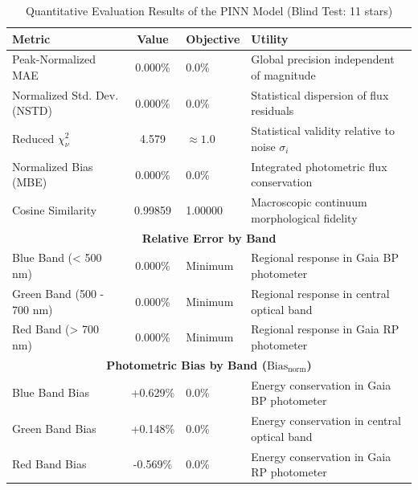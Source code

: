 
\begin{table}[htpb]
\centering
\caption{Quantitative Evaluation Results of the PINN Model (Blind Test: 11 stars)}
\label{tab:pinn_evaluation}
\begin{tabular}{lcll}
\hline
\textbf{Metric} & \textbf{Value} & \textbf{Objective} & \textbf{Utility} \\
\hline
Peak-Normalized MAE & 0.000\% & 0.0\% & Global precision independent of magnitude \\
Normalized Std. Dev. (NSTD) & 0.000\% & 0.0\% & Statistical dispersion of flux residuals \\
Reduced $\chi^2_\nu$ & 4.579 & $\approx 1.0$ & Statistical validity relative to noise $\sigma_i$ \\
Normalized Bias (MBE) & 0.000\% & 0.0\% & Integrated photometric flux conservation \\
Cosine Similarity & 0.99859 & 1.00000 & Macroscopic continuum morphological fidelity \\
\hline
\multicolumn{4}{c}{\textbf{Relative Error by Band}} \\
\hline
Blue Band (< 500 nm) & 0.000\% & Minimum & Regional response in Gaia BP photometer \\
Green Band (500 - 700 nm) & 0.000\% & Minimum & Regional response in central optical band \\
Red Band (> 700 nm) & 0.000\% & Minimum & Regional response in Gaia RP photometer \\
\hline
\multicolumn{4}{c}{\textbf{Photometric Bias by Band ($\text{Bias}_{\text{norm}}$)}} \\
\hline
Blue Band Bias & +0.629\% & 0.0\% & Energy conservation in Gaia BP photometer \\
Green Band Bias & +0.148\% & 0.0\% & Energy conservation in central optical band \\
Red Band Bias & -0.569\% & 0.0\% & Energy conservation in Gaia RP photometer \\
\hline
\end{tabular}
\end{table}
